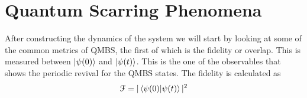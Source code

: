 \section{Quantum Scarring Phenomena}
After constructing the dynamics of the system we will start by looking at some of the common metrics of QMBS, the first of which is the fidelity or overlap. This is measured between $\ket{\psi(0)}$ and $\ket{\psi(t)}$.
This is the one of the observables that shows the periodic revival for the QMBS states. The fidelity is calculated as 
\begin{equation}\label{eq:fidelity}
\mathcal{F} = |\bra{\psi(0)}\ket{\psi(t)}|^2
\end{equation}